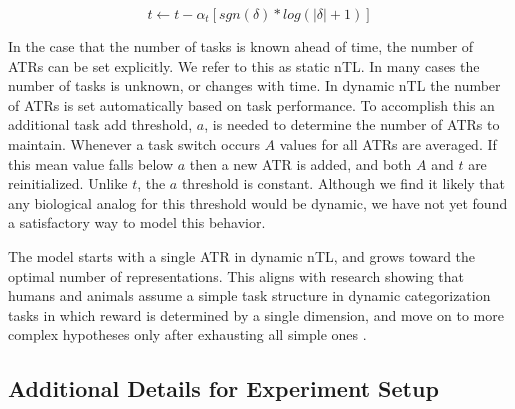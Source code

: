 \documentclass[10pt,letterpaper]{article}
\begin{document}
\begin{equation}
t \leftarrow t - \alpha_t [sgn(\delta) * log(|\delta| + 1)]
\label{eq:t_update}
\end{equation}

In the case that the number of tasks is known ahead of time, the number of ATRs can be set explicitly. We refer to this as static nTL. In many cases the number of tasks is unknown, or changes with time. In dynamic nTL the number of ATRs is set automatically based on task performance. To accomplish this an additional task add threshold, $a$, is needed to determine the number of ATRs to maintain. Whenever a task switch occurs $ A $ values for all ATRs are averaged. If this mean value falls below $ a $ then a new ATR is added, and both $ A $ and $ t $ are reinitialized. Unlike $ t $, the $ a $ threshold is constant. Although we find it likely that any biological analog for this threshold would be dynamic, we have not yet found a satisfactory way to model this behavior.

The model starts with a single ATR in dynamic nTL, and grows toward the optimal number of representations. This aligns with research showing that humans and animals assume a simple task structure in dynamic categorization tasks in which reward is determined by a single dimension, and move on to more complex hypotheses only after exhausting all simple ones \cite{shepard_learning_1961}.

\subsection{Additional Details for Experiment Setup}
\end{document}
